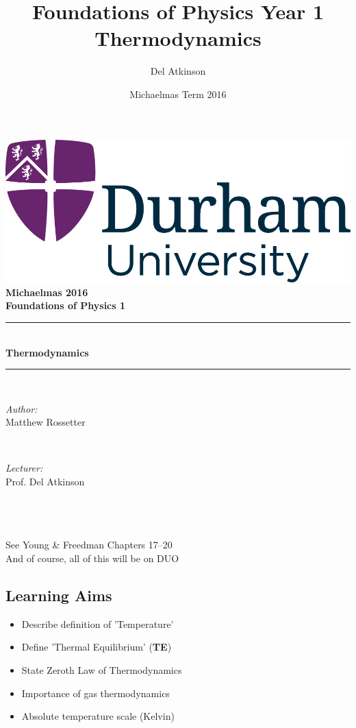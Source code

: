 \documentclass[a4paper, 11pt, normalem]{report}
\title{Foundations of Physics Year 1 \\ Thermodynamics \vspace{-20pt}}
\author{Del Atkinson}
\date{\vspace{-15pt}Michaelmas Term 2016}
\begin{document}
\begin{titlepage}
    \newcommand{\HRule}{\rule{\linewidth}{0.5mm}}
    \center
    {\includegraphics[scale=0.5]{../../logo0.png}\hfill{\Large\bfseries Michaelmas 2016}}\\[2.5cm]
    {\LARGE\bfseries Foundations of Physics 1}\\[1.5cm]
    \HRule \\[0.7cm]
    {\huge\bfseries Thermodynamics}\\[0.4cm]
    \HRule \\[1.5cm]

    \begin{minipage}{0.4\textwidth}
        \begin{flushleft} \large
            \emph{Author:} \\ Matthew Rossetter
        \end{flushleft}
    \end{minipage}~
    \begin{minipage}{0.4\textwidth}
        \begin{flushright} \large
            \emph{Lecturer:} \\ Prof. Del Atkinson
        \end{flushright}
    \end{minipage}\\[2cm]
    \vfill
\end{titlepage}

\chapter{}
See Young \& Freedman Chapters 17--20 \\
And of course, all of this will be on DUO
\section{Learning Aims}
\begin{itemize}
    \item Describe definition of 'Temperature'
    \item Define 'Thermal Equilibrium' (\textbf{TE})
    \item State Zeroth Law of Thermodynamics
    \item Importance of gas thermodynamics
    \item Absolute temperature scale (Kelvin)
\end{itemize}
\end{document}
